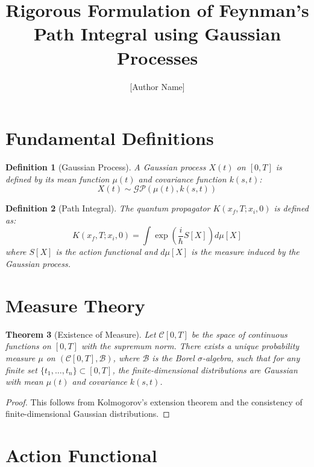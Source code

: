 \documentclass{article}
\title{Rigorous Formulation of Feynman's Path Integral using Gaussian Processes}
\author{[Author Name]}
\newtheorem{theorem}{Theorem}
\newtheorem{definition}[theorem]{Definition}
\begin{document}
\maketitle

\section{Fundamental Definitions}

\begin{definition}[Gaussian Process]
A Gaussian process $X(t)$ on $[0,T]$ is defined by its mean function $\mu(t)$ and covariance function $k(s,t)$:
\begin{equation}
    X(t) \sim \mathcal{GP}(\mu(t), k(s,t))
\end{equation}
\end{definition}

\begin{definition}[Path Integral]
The quantum propagator $K(x_f, T; x_i, 0)$ is defined as:
\begin{equation}
    K(x_f, T; x_i, 0) = \int \exp\left(\frac{i}{\hbar}S[X]\right) d\mu[X]
\end{equation}
where $S[X]$ is the action functional and $d\mu[X]$ is the measure induced by the Gaussian process.
\end{definition}

\section{Measure Theory}

\begin{theorem}[Existence of Measure]
Let $\mathcal{C}[0,T]$ be the space of continuous functions on $[0,T]$ with the supremum norm. There exists a unique probability measure $\mu$ on $(\mathcal{C}[0,T], \mathcal{B})$, where $\mathcal{B}$ is the Borel $\sigma$-algebra, such that for any finite set $\{t_1, \ldots, t_n\} \subset [0,T]$, the finite-dimensional distributions are Gaussian with mean $\mu(t)$ and covariance $k(s,t)$.
\end{theorem}

\begin{proof}
This follows from Kolmogorov's extension theorem and the consistency of finite-dimensional Gaussian distributions.
\end{proof}

\section{Action Functional}
\end{document}
